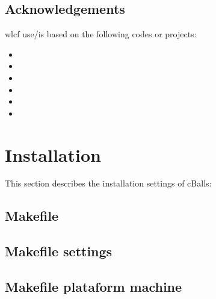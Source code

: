 \documentclass[letterpaper,10pt,english]{sphinxmanual}
\begin{document}
\section{Acknowledgements}
\label{\detokenize{overview:acknowledgements}}
\sphinxAtStartPar
wlcf use/is based on the following codes or projects:
\begin{itemize}
\item {} 
\sphinxAtStartPar
{}

\item {} 
\sphinxAtStartPar
{}

\item {} 
\sphinxAtStartPar
{}

\item {} 
\sphinxAtStartPar
{}

\item {} 
\sphinxAtStartPar
{}

\item {} 
\sphinxAtStartPar
{}

\end{itemize}

\sphinxstepscope


\chapter{Installation}
\label{\detokenize{installation:installation}}\label{\detokenize{installation::doc}}
\sphinxAtStartPar
This section describes the installation settings of cBalls:


\section{Makefile}
\label{\detokenize{installation:makefile}}

\section{Makefile settings}
\label{\detokenize{installation:makefile-settings}}

\section{Makefile plataform machine}
\label{\detokenize{installation:makefile-plataform-machine}}
\sphinxstepscope
\end{document}

